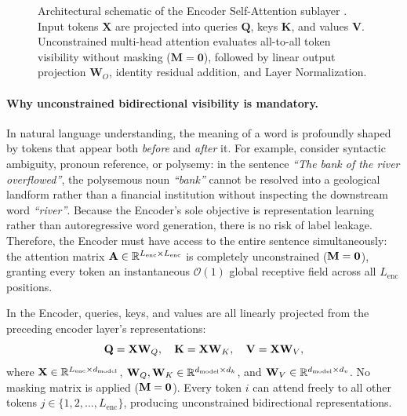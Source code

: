 \documentclass[../../main.tex]{subfiles}
\begin{document}
\begin{figure}[htbp]
\caption{Architectural schematic of the Encoder Self-Attention sublayer \cite{vaswani2017}. Input tokens $\mathbf{X}$ are projected into queries $\mathbf{Q}$, keys $\mathbf{K}$, and values $\mathbf{V}$. Unconstrained multi-head attention evaluates all-to-all token visibility without masking ($\mathbf{M}=\mathbf{0}$), followed by linear output projection $\mathbf{W}_O$, identity residual addition, and Layer Normalization.}
\label{fig:vaswani_highlight_encoder_mha}
\end{figure}

\paragraph{Why unconstrained bidirectional visibility is mandatory.}
In natural language understanding, the meaning of a word is profoundly shaped by tokens that appear both \emph{before} and \emph{after} it. For example, consider syntactic ambiguity, pronoun reference, or polysemy: in the sentence \emph{``The bank of the river overflowed''}, the polysemous noun \emph{``bank''} cannot be resolved into a geological landform rather than a financial institution without inspecting the downstream word \emph{``river''}. 
Because the Encoder's sole objective is representation learning rather than autoregressive word generation, there is no risk of label leakage. Therefore, the Encoder must have access to the entire sentence simultaneously: the attention matrix $\mathbf{A} \in \mathbb{R}^{L_{\text{enc}} \times L_{\text{enc}}}$ is completely unconstrained ($\mathbf{M} = \mathbf{0}$), granting every token an instantaneous $\mathcal{O}(1)$ global receptive field across all $L_{\text{enc}}$ positions.

In the Encoder, queries, keys, and values are all linearly projected from the preceding encoder layer's representations:
\begin{equation}
\label{eq:encoder_self_attn_projections}
\mathbf{Q} = \mathbf{X} \mathbf{W}_Q, \quad \mathbf{K} = \mathbf{X} \mathbf{W}_K, \quad \mathbf{V} = \mathbf{X} \mathbf{W}_V,
\end{equation}
where $\mathbf{X} \in \mathbb{R}^{L_{\text{enc}} \times d_{\text{model}}}$, $\mathbf{W}_Q, \mathbf{W}_K \in \mathbb{R}^{d_{\text{model}} \times d_k}$, and $\mathbf{W}_V \in \mathbb{R}^{d_{\text{model}} \times d_v}$. No masking matrix is applied ($\mathbf{M} = \mathbf{0}$). Every token $i$ can attend freely to all other tokens $j \in \{1, 2, \dots, L_{\text{enc}}\}$, producing unconstrained bidirectional representations.
\end{document}
